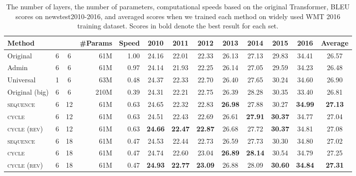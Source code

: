 \documentclass[11pt]{article}
\begin{document}
\begin{table*}[!t]
  \centering{}
  \footnotesize
  \begin{tabular}{ l | c c | r | r | c c c c c c c | c} \hline
  Method &  &  & \multicolumn{1}{c|}{\#Params} & Speed & 2010 & 2011 & 2012 & 2013 & 2014 & 2015 & 2016 & Average \\ \hline \hline
  Original & 6 & 6 & 61M & 1.00 & 24.16 & 22.01 & 22.33 & 26.13 & 27.13 & 29.83 & 34.41 & 26.57 \\
  Admin & 6 & 6 & 61M & 0.97 & 24.14 & 21.93 & 22.25 & 26.14 & 27.05 & 29.59 & 34.23 & 26.48 \\
  Universal & 1 & 6 & 63M & 0.48 & 24.37 & 22.33 & 22.70 & 26.40 & 27.65 & 30.24 & 34.60 & 26.90 \\
  Original (big) & 6 & 6 & 210M & 0.39 & 24.31 & 22.21 & 22.75 & 26.39 & 28.28 & 30.35 & 33.40 & 26.81 \\
  \textsc{sequence} & 6 & 12 & 61M & 0.63 & 24.65 & 22.32 & 22.83 & \textbf{26.98} & 27.88 & 30.27 & \textbf{34.99} & \textbf{27.13} \\  
  \textsc{cycle} & 6 & 12 & 61M & 0.63 & 24.51 & 22.43 & 22.69 & 26.61 & \textbf{27.91} & \textbf{30.37} & 34.77 & 27.04 \\
  \textsc{cycle (rev)} & 6 & 12 & 61M & 0.63 & \textbf{24.66} & \textbf{22.47} & \textbf{22.87} & 26.68 & 27.72 & \textbf{30.37} & 34.81 & 27.08 \\ \hline
  \textsc{sequence} & 6 & 18 & 61M & 0.47 & 24.53 & 22.44 & 22.73 & 26.59 & 27.73 & 30.30 & 34.80 & 27.02 \\
  \textsc{cycle} & 6 & 18 & 61M & 0.47 & 24.74 & 22.60 & 23.04 & \textbf{26.89} & \textbf{28.14} & 30.54 & 34.79 & 27.25 \\
  \textsc{cycle (rev)} & 6 & 18 & 61M & 0.47 & \textbf{24.93} & \textbf{22.77} & \textbf{23.09} & 26.88 & 28.09 & \textbf{30.60} & \textbf{34.84} & \textbf{27.31} \\ \hline
  \end{tabular}
  \caption{The number of layers, the number of parameters, computational speeds based on the original Transformer, BLEU scores on newstest2010-2016, and averaged scores when we trained each method on widely used WMT 2016 training dataset. Scores in bold denote the best result for each set.\label{tab:exp_main_result}}
\end{table*}
\end{document}
